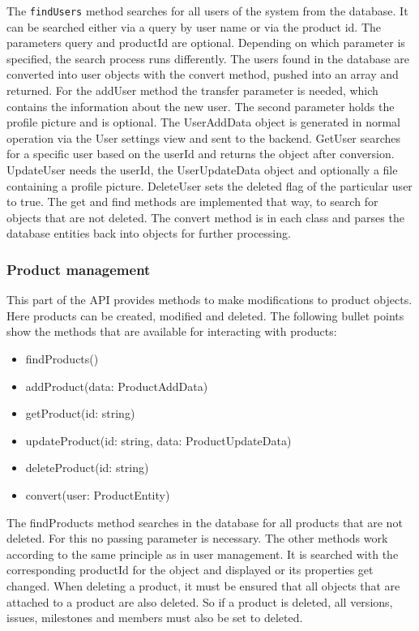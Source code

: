    The \texttt{findUsers} method searches for all users of the system from the database. It can be searched either via a query by user name or via the product id. The parameters query and productId are optional. Depending on which parameter is specified, the search process runs differently. The users found in the database are converted into user objects with the convert method, pushed into an array and returned. For the addUser method the transfer parameter is needed, which contains the information about the new user. The second parameter holds the profile picture and is optional. The UserAddData object is generated in normal operation via the User settings view and sent to the backend. GetUser searches for a specific user based on the userId and returns the object after conversion. UpdateUser needs the userId, the UserUpdateData object and optionally a file containing a profile picture. DeleteUser sets the deleted flag of the particular user to true. The get and find methods are implemented that way, to search for objects that are not deleted. The convert method is in each class and parses the database entities back into objects for further processing.

    \subsubsection*{Product management}
    This part of the API provides methods to make modifications to product objects. Here products can be created, modified and deleted. The following bullet points show the methods that are available for interacting with products:

    \begin{itemize}
        \item findProducts()
        \item addProduct(data: ProductAddData)
        \item getProduct(id: string)
        \item updateProduct(id: string, data: ProductUpdateData)
        \item deleteProduct(id: string)
        \item convert(user: ProductEntity)
    \end{itemize}

    The findProducts method searches in the database for all products that are not deleted. For this no passing parameter is necessary. The other methods work according to the same principle as in user management. It is searched with the corresponding productId for the object and displayed or its properties get changed. When deleting a product, it must be ensured that all objects that are attached to a product are also deleted. So if a product is deleted, all versions, issues, milestones and members must also be set to deleted.

